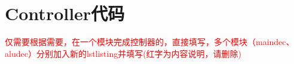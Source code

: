\appendix
\section{Controller代码}
\textcolor{red}{仅需要根据需要，在一个模块完成控制器的，直接填写，多个模块（maindec、aludec）分别加入新的lstlisting并填写(红字为内容说明，请删除)}
\begin{lstlisting}[language=Verilog]

\end{lstlisting}
